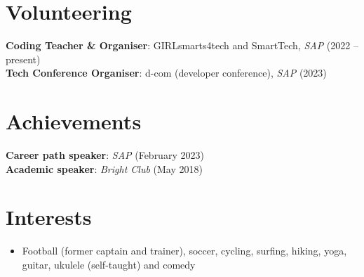 \documentclass[letterpaper,11pt]{article}
\newcommand{\resumeItem}[1]{
  \item\small{
    {#1 \vspace{-2pt}}
  }
}
\newcommand{\resumeSubHeadingListStart}{\begin{itemize}[leftmargin=0.15in, label={}]}
\newcommand{\resumeSubHeadingListEnd}{\end{itemize}}
\begin{document}
 
\section{Volunteering}
 \begin{itemize}[leftmargin=0.15in, label={}]
    \small{\item{
     \textbf{Coding Teacher \& Organiser}{: GIRLsmarts4tech and SmartTech, \textit{SAP} (2022 -- present)} \\
     \textbf{Tech Conference Organiser}{: d-com (developer conference), \textit{SAP} (2023)} \\
    }}
 \end{itemize}
 

\section{Achievements}
 \begin{itemize}[leftmargin=0.15in, label={}]
    \small{\item{
     \textbf{Career path speaker}{: \textit{SAP} (February 2023)} \\
     \textbf{Academic speaker}{: \textit{Bright Club} (May 2018)} \\
    }}
 \end{itemize}


\section{Interests}
 \resumeSubHeadingListStart
 \resumeItem{Football (former captain and trainer), soccer, cycling, surfing, hiking, yoga, guitar, ukulele (self-taught) and comedy}
 \resumeSubHeadingListEnd

 
\end{document}
